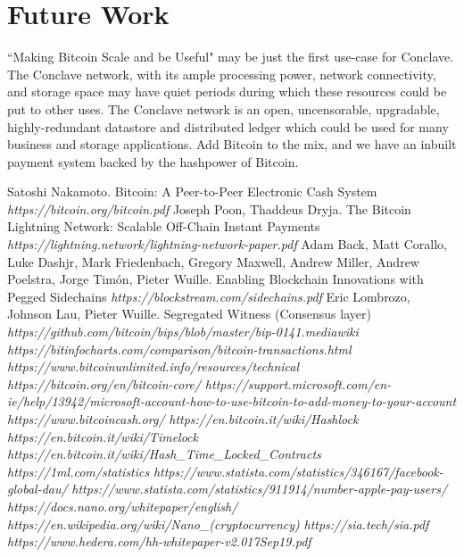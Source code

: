 \documentclass{report}
\begin{document}
	\section{Future Work}
	``Making Bitcoin Scale and be Useful" may be just the first use-case for Conclave. The Conclave network, with its ample processing power, network connectivity, and storage space may have quiet periods during which these resources could be put to other uses. The Conclave network is an open, uncensorable, upgradable, highly-redundant datastore and distributed ledger which could be used for many business and storage applications. Add Bitcoin to the mix, and we have an inbuilt payment system backed by the hashpower of Bitcoin.
\begin{thebibliography}{2}
	 Satoshi Nakamoto. Bitcoin: A Peer-to-Peer Electronic Cash System \textit{https://bitcoin.org/bitcoin.pdf}
	 Joseph Poon, Thaddeus Dryja. The Bitcoin Lightning Network: Scalable Off-Chain Instant Payments \textit{https://lightning.network/lightning-network-paper.pdf}
	 Adam Back, Matt Corallo, Luke Dashjr, Mark Friedenbach, Gregory Maxwell, Andrew Miller, Andrew Poelstra, Jorge Timón, Pieter Wuille. Enabling Blockchain Innovations with Pegged Sidechains \textit{https://blockstream.com/sidechains.pdf}
	 Eric Lombrozo, Johnson Lau, Pieter Wuille. Segregated Witness (Consensus layer) \textit{https://github.com/bitcoin/bips/blob/master/bip-0141.mediawiki}
	 \textit{https://bitinfocharts.com/comparison/bitcoin-transactions.html}
	 \textit{https://www.bitcoinunlimited.info/resources/technical}
	 \textit{https://bitcoin.org/en/bitcoin-core/}
	 \textit{https://support.microsoft.com/en-ie/help/13942/microsoft-account-how-to-use-bitcoin-to-add-money-to-your-account}
	 \textit{https://www.bitcoincash.org/}
	 \textit{https://en.bitcoin.it/wiki/Hashlock}
	 \textit{https://en.bitcoin.it/wiki/Timelock}
	 \textit{https://en.bitcoin.it/wiki/Hash\_Time\_Locked\_Contracts}
	 \textit{https://1ml.com/statistics}
	 \textit{https://www.statista.com/statistics/346167/facebook-global-dau/}
	 \textit{https://www.statista.com/statistics/911914/number-apple-pay-users/}
	 \textit{https://docs.nano.org/whitepaper/english/}
	 \textit{https://en.wikipedia.org/wiki/Nano\_(cryptocurrency)}
	 \textit{https://sia.tech/sia.pdf}
	 \textit{https://www.hedera.com/hh-whitepaper-v2.0\-17Sep19.pdf}

\end{thebibliography}
\end{document}
